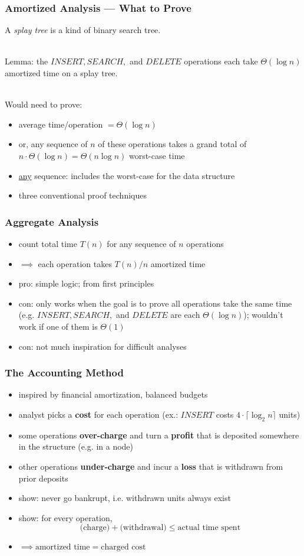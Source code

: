 \documentclass{beamer}
\newcommand{\stanza}{ \\~\ }
\begin{document}
\begin{frame} \frametitle{Amortized Analysis --- What to Prove}
A \emph{splay tree} is a kind of binary search tree. \stanza

Lemma: the $INSERT, SEARCH,$ and $DELETE$ operations each take $\Theta(\log n)$
amortized time on a splay tree. \stanza

Would need to prove:
\begin{itemize}
  \item average time/operation $= \Theta(\log n)$
  \item or, any sequence of $n$ of these operations takes a grand total of
    $n \cdot \Theta(\log n) = \Theta(n \log n)$ worst-case time
  \item \underline{any} sequence: includes the worst-case for the data structure
  \item three conventional proof techniques
\end{itemize}
\end{frame}

\begin{frame} \frametitle{Aggregate Analysis}
\begin{itemize}
  \item count total time $T(n)$ for any sequence of $n$ operations
  \item $\implies$ each operation takes $T(n)/n$ amortized time
  \item pro: simple logic; from first principles
  \item con: only works when the goal is to prove all operations take the
    same time (e.g. $INSERT, SEARCH,$ and $DELETE$ are each $\Theta(\log n)$);
    wouldn't work if one of them is $\Theta(1)$
  \item con: not much inspiration for difficult analyses
\end{itemize}
\end{frame}

\begin{frame} \frametitle{The Accounting Method}
\begin{itemize}
  \item inspired by financial amortization, balanced budgets
  \item analyst picks a \textbf{cost} for each operation
    (ex.: $INSERT$ costs $4 \cdot \lceil \log_2 n \rceil$ units)
  \item some operations \textbf{over-charge} and turn a \textbf{profit} that is
    deposited somewhere in the structure (e.g. in a node)
  \item other operations \textbf{under-charge} and incur a \textbf{loss} that
    is withdrawn from prior deposits
  \item show: never go bankrupt, i.e. withdrawn units always exist
  \item show: for every operation,
    \[ \text{(charge)} + \text{(withdrawal)} \leq \text{actual time spent} \]
  \item $\implies \text{amortized time} = \text{charged cost}$
\end{itemize}
\end{frame}
\end{document}
